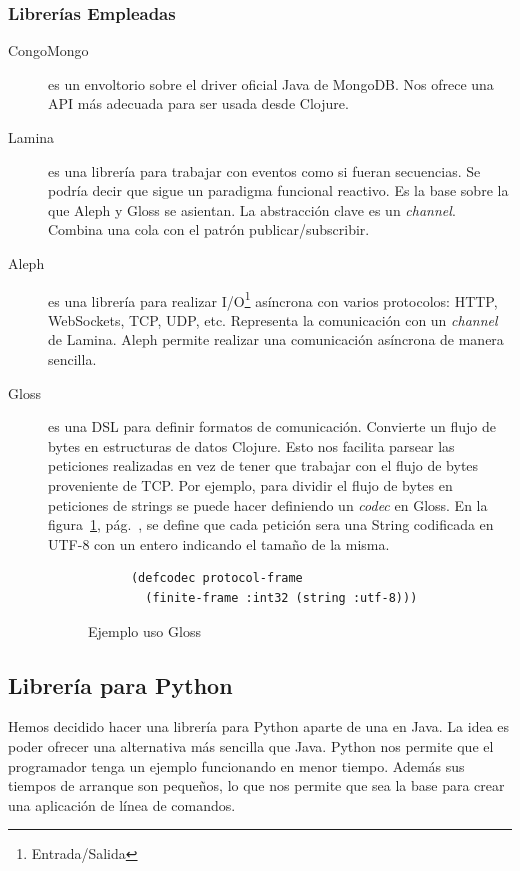 \subsubsection{Librerías Empleadas}
\begin{description}
\item[CongoMongo]\cite{CONGO-MONGO} es un envoltorio sobre el driver
  oficial Java de MongoDB. Nos ofrece una API más adecuada para ser
  usada desde Clojure.
\item[Lamina] es una librería para trabajar con eventos como si fueran
  secuencias. Se podría decir que sigue un paradigma funcional
  reactivo\cite{FRP}. Es la base sobre la que Aleph y Gloss se
  asientan. La abstracción clave es un \emph{channel}. Combina una
  cola con el patrón publicar/subscribir.
\item[Aleph] es una librería para realizar
  I/O\footnote{Entrada/Salida} asíncrona con varios protocolos: HTTP,
  WebSockets, TCP, UDP, etc. Representa la comunicación con un
  \emph{channel} de Lamina. Aleph permite realizar una comunicación
  asíncrona de manera sencilla.
\item[Gloss] es una DSL para definir formatos de
  comunicación. Convierte un flujo de bytes en estructuras de datos
  Clojure. Esto nos facilita parsear las peticiones realizadas en vez
  de tener que trabajar con el flujo de bytes proveniente de TCP. Por
  ejemplo, para dividir el flujo de bytes en peticiones de strings se
  puede hacer definiendo un \emph{codec} en Gloss. En la
  figura~\ref{gloss-example}, pág.~\pageref{gloss-example}, se define
  que cada petición sera una String codificada en UTF-8 con un entero
  indicando el tamaño de la misma.
  \begin{figure}[hb]
    \begin{center}
      \begin{verbatim}
      (defcodec protocol-frame
        (finite-frame :int32 (string :utf-8)))
        \end{verbatim}
    \end{center}
  \caption{Ejemplo uso Gloss}\label{gloss-example}
  \end{figure}
\end{description}

\subsection{Librería para Python}

Hemos decidido hacer una librería para Python aparte de una en
Java. La idea es poder ofrecer una alternativa más sencilla que
Java. Python nos permite que el programador tenga un ejemplo
funcionando en menor tiempo. Además sus tiempos de arranque son
pequeños, lo que nos permite que sea la base para crear una aplicación
de línea de comandos.

